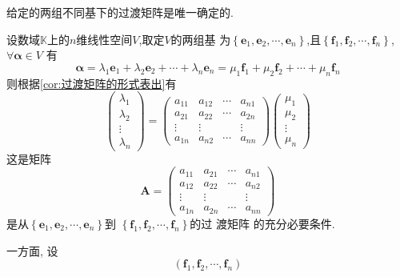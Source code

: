 \begin{red}
\begin{remark}
    给定的两组不同基下的过渡矩阵是唯一确定的.
\end{remark}
\end{red}
\begin{green}
\begin{lemma}[过渡矩阵的确定]\label{lem:过渡矩阵的确定}
    设数域$\mathbb{K}$上的$n$维线性空间$V$,取定$V$的两组基
    为$\left\{\bm{e}_1,\bm{e}_2,\cdots,
    \bm{e}_n\right\}$,且$
    \left\{\bm{f}_1,\bm{f}_2
    ,\cdots,\bm{f}_n\right\}$,$\forall
    \bm{\alpha} \in V$
    有
    \[
    \bm{\alpha}=
    \lambda _1\bm{e}_1+\lambda_2\bm{e}_2+\cdots
    +\lambda _n\bm{e}_n
    =\mu _1\bm{f}_1+\mu_2\bm{f}_2+\cdots
    +\mu _n\bm{f}_n
    \]
    则根据\cref{cor:过渡矩阵的形式表出}有
    \[
    \begin{pmatrix}
        \lambda _1 \\
        \lambda_2\\
        \vdots \\
        \lambda _n
    \end{pmatrix}
    = \begin{pmatrix}
        a_{11} & a_{12}&\cdots & a_{n1} \\
        a_{21}&a_{22}&\cdots&a_{2n}\\
        \vdots & \vdots& & \vdots \\
        a_{1n} & a_{n2}&\cdots & a_{nn}
    \end{pmatrix}
    \begin{pmatrix}
        \mu _1 \\
        \mu_2\\
        \vdots \\
        \mu_n
    \end{pmatrix}
    \]
    这是矩阵\[
    \bm{A} = \begin{pmatrix}
        a_{11} & a_{21}&\cdots & a_{n1} \\
        a_{12}&a_{22}&\cdots&a_{n2}\\
        \vdots & \vdots& & \vdots \\
        a_{1n} & a_{2n}&\cdots & a_{nn}
    \end{pmatrix}
    \]是从$\left\{\bm{e}_1,\bm{e}_2,\cdots,
    \bm{e}_n\right\}$到
    $
    \left\{\bm{f}_1,\bm{f}_2
    ,\cdots,\bm{f}_n\right\}$的过
    渡矩阵
    的充分必要条件.
\end{lemma}
\begin{Proof}
    一方面,
设
\[
    \left(\bm{f}_1,\bm{f}_2,\cdots,\bm{f}_n\right)
\]
\end{Proof}
\end{green}
